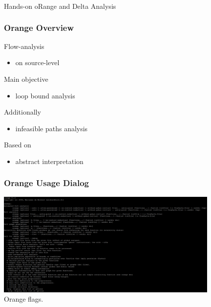 \documentclass{beamer}
\begin{document}
\begin{frame}[fragile]
  \frametitle{}

  \begin{center}
  Hands-on oRange and Delta Analysis
  \end{center}
\end{frame} 



\begin{frame}[fragile]
  \frametitle{Orange Overview}

  \bigskip 
  Flow-analysis
  \begin{itemize}
    \item on source-level
  \end{itemize}

  \bigskip
  Main objective 
  \begin{itemize}
    \item loop bound analysis
  \end{itemize}

  \bigskip
  Additionally 
  \begin{itemize}
    \item infeasible paths analysis
  \end{itemize}

  \bigskip
  Based on 
  \begin{itemize}
    \item abstract interpretation 
  \end{itemize}
\end{frame} 



\begin{frame}[fragile]
  \frametitle{Orange Usage Dialog}
  \begin{center}
    \includegraphics[width=11cm]{img/orange_flags.pdf} \\

    \bigskip
    Orange flags.
  \end{center}
\end{frame} 
\end{document}
